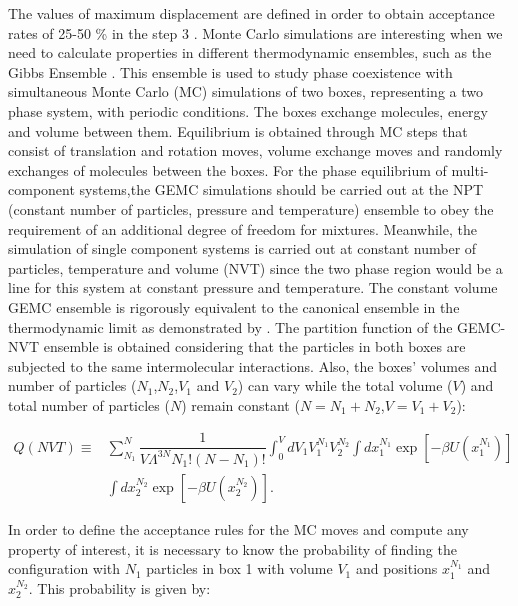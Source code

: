	The values of maximum displacement are defined in order to obtain acceptance rates of 25-50 \% in the step 3   \cite{Frenkel2013}. Monte Carlo simulations are interesting when we need to calculate properties in different thermodynamic ensembles, such as the Gibbs Ensemble \cite{papa1987}. This ensemble  is used to study phase coexistence with simultaneous Monte Carlo (MC) simulations of two boxes,  representing a two phase system, with periodic conditions. The boxes exchange molecules, energy and volume between them. Equilibrium is obtained through MC steps that consist of translation and rotation moves, volume exchange moves and randomly exchanges of molecules between the boxes. For the phase equilibrium of multi-component systems,the GEMC simulations should be carried out at the NPT (constant number of particles, pressure and temperature) ensemble to obey the requirement of an additional degree of freedom for mixtures. Meanwhile, the simulation of single component systems is carried out at constant number of particles, temperature and volume (NVT) since the two phase region would be a line for this system at constant pressure and temperature. The constant volume GEMC ensemble is rigorously equivalent to the canonical ensemble in the thermodynamic limit as demonstrated by . The partition function of the GEMC-NVT ensemble is obtained considering that the particles in both boxes are subjected to the same intermolecular interactions. Also, the boxes’ volumes and number of particles ($N_{1}$,$N_{2}$,$V_{1}$ and $V_{2}$) can vary while the total volume ($V$) and total number of particles ($N$) remain constant ($N = N_{1} + N_{2}$,$V = V_{1} + V_{2}$):
	
	\begin{equation}
	\begin{aligned}
	Q(NVT) {} \equiv & \sum_{N_{1}}^{N} \dfrac{1}{V \Lambda ^{3N} N_{1}!(N-N_{1})!} \int_{0}^{V} dV_{1} V_{1}^{N_{1}} V_{2}^{N_{2}} \int dx_{1}^{N_{1}} \exp[-\beta U(x_{1}^{N_{1}})] \\
	& \int dx_{2}^{N_{2}} \exp[-\beta U(x_{2}^{N_{2}})] .
	\end{aligned}
	\label{eqn:gepart}
	\end{equation}
	
	In order to define the acceptance rules for the MC moves and compute any property of interest, it is necessary to know the probability of finding the configuration with $N_{1}$ particles in box 1 with volume $V_{1}$ and positions $x_{1}^{N_{1}}$ and $x_{2}^{N_{2}}$. This probability is given by:
	
